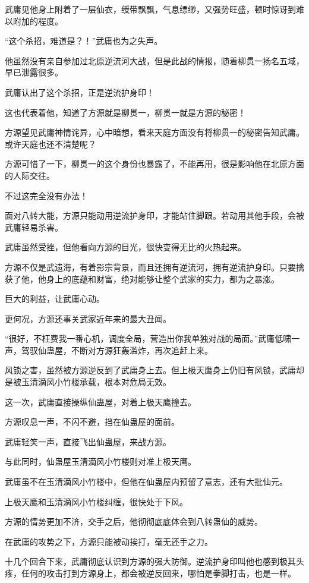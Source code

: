 \begin{this_body}
武庸见他身上附着了一层仙衣，绶带飘飘，气息缥缈，又强势旺盛，顿时惊讶到难以附加的程度。

“这个杀招，难道是？！”武庸也为之失声。

他虽然没有亲自参加过北原逆流河大战，但是此战的情报，随着柳贯一扬名五域，早已泄露很多。

武庸认出了这个杀招，正是逆流护身印！

这也代表着他，知道了方源就是柳贯一，柳贯一就是方源的秘密！

方源望见武庸神情诧异，心中暗想，看来天庭方面没有将柳贯一的秘密告知武庸。或许天庭也还不清楚呢？

方源可惜了一下，柳贯一的这个身份也暴露了，不能再用，很是影响他在北原方面的人际交往。

不过这完全没有办法！

面对八转大能，方源只能动用逆流护身印，才能站住脚跟。若动用其他手段，会被武庸轻易杀害。

武庸虽然受挫，但他看向方源的目光，很快变得无比的火热起来。

方源不仅是武遗海，有着影宗背景，而且还拥有逆流河，拥有逆流护身印。只要擒获了他，他身上的底蕴和财富，绝对能够让整个武家的实力，都为之暴涨。

巨大的利益，让武庸心动。

更何况，方源还事关武家近年来的最大丑闻。

“很好，不枉费我一番心机，调度全局，营造出你我单独对战的局面。”武庸低啸一声，驾驭仙蛊屋，不断对方源狂轰滥炸，再次追赶上来。

风锁之害，虽然被方源逆反到了武庸身上去。但上极天鹰身上仍旧有风锁，武庸却是被玉清滴风小竹楼承载，根本对危局无效。

这一次，武庸直接操纵仙蛊屋，对着上极天鹰撞去。

方源叹息一声，不闪不避，挡在仙蛊屋的面前。

武庸轻笑一声，直接飞出仙蛊屋，来战方源。

与此同时，仙蛊屋玉清滴风小竹楼则对准上极天鹰。

武庸虽不在玉清滴风小竹楼中，但他在仙蛊屋内预留了意志，还有大批仙元。

上极天鹰和玉清滴风小竹楼纠缠，很快处于下风。

方源的情势更加不济，交手之后，他彻彻底底体会到八转蛊仙的威势。

在武庸的攻势之下，方源只能被动挨打，毫无还手之力。

十几个回合下来，武庸彻底认识到方源的强大防御。逆流护身印叫他也感到极其头疼，任何的攻击打到方源身上，都会被逆反回来，哪怕是拳脚打击，也是一样。


\end{this_body}
